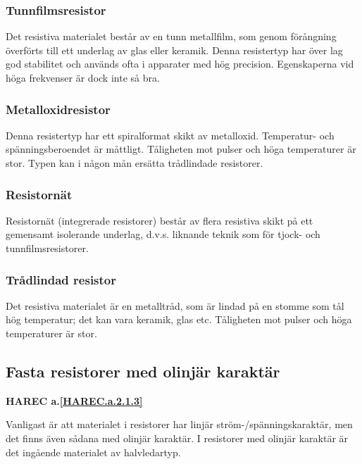 \subsubsection{Tunnfilmsresistor}

Det resistiva materialet består av en tunn metallfilm, som genom förångning
överförts till ett underlag av glas eller keramik. Denna resistertyp har över
lag god stabilitet och används ofta i apparater med hög precision. Egenskaperna
vid höga frekvenser är dock inte så bra.

\subsubsection{Metalloxidresistor}

Denna resistertyp har ett spiralformat skikt av metalloxid. Temperatur- och
spänningsberoendet är måttligt. Tåligheten mot pulser och höga temperaturer är
stor. Typen kan i någon mån ersätta trådlindade resistorer.

\subsubsection{Resistornät}

Resistornät (integrerade resistorer) består av flera resistiva skikt på ett
gemensamt isolerande underlag, d.v.s. liknande teknik som för tjock- och
tunnfilmsresistorer.

\subsubsection{Trådlindad resistor}

Det resistiva materialet är en metalltråd, som är lindad på en stomme som tål
hög temperatur; det kan vara keramik, glas etc.
Tåligheten mot pulser och höga temperaturer är stor.

\subsection{Fasta resistorer med olinjär karaktär}
\textbf{HAREC a.\ref{HAREC.a.2.1.3}\label{myHAREC.a.2.1.3}}

Vanligast är att materialet i resistorer har linjär ström-/spänningskaraktär,
men det finns även sådana med olinjär karaktär. I resistorer med olinjär
karaktär är det ingående materialet av halvledartyp.

